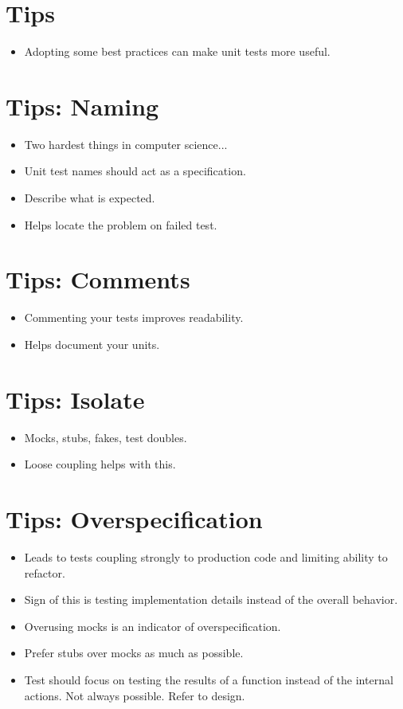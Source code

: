 \documentclass{article}
\begin{document}
\newpage
\section{Tips}
\begin{itemize}
    \item Adopting some best practices can make unit tests more useful.
\end{itemize}

\newpage
\section{Tips: Naming}
\begin{itemize}
    \item Two hardest things in computer science...
    \item Unit test names should act as a specification.
    \item Describe what is expected.
    \item Helps locate the problem on failed test.
\end{itemize}

\newpage
\section{Tips: Comments}
\begin{itemize}
    \item Commenting your tests improves readability.
    \item Helps document your units.
\end{itemize}

\newpage
\section{Tips: Isolate}
\begin{itemize}
    \item Mocks, stubs, fakes, test doubles.
    \item Loose coupling helps with this.
\end{itemize}

\newpage
\section{Tips: Overspecification}
\begin{itemize}
    \item Leads to tests coupling strongly to production code and limiting
        ability to refactor.
    \item Sign of this is testing implementation details instead of the overall
        behavior.
    \item Overusing mocks is an indicator of overspecification.
    \item Prefer stubs over mocks as much as possible.
    \item Test should focus on testing the results of a function instead of the
        internal actions. Not always possible. Refer to design.
\end{itemize}
\end{document}
